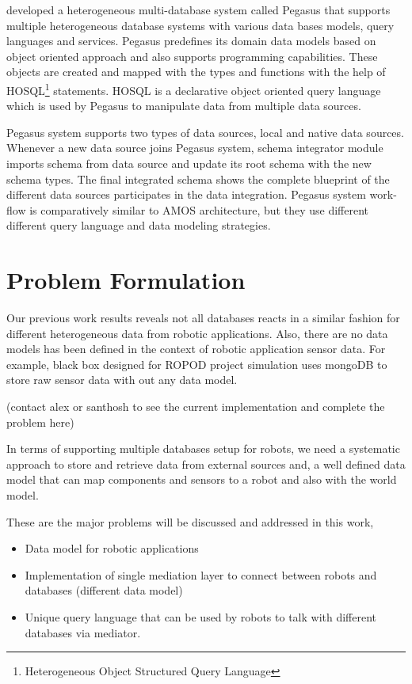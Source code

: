 \documentclass[12pt]{article}
\begin{document}
\citet{ahmed1991pegasus} developed a heterogeneous multi-database system called Pegasus that supports multiple heterogeneous database systems with various data bases models, query languages and services. Pegasus predefines its domain data models based on object oriented approach and also supports programming capabilities. These objects are created and mapped with the types and functions with the help of HOSQL\footnote{\label{myfootnote}Heterogeneous Object Structured Query Language} statements. HOSQL is a declarative object oriented query language which is used by Pegasus to manipulate data from multiple data sources.



Pegasus system supports two types of data sources, local and native data sources. Whenever a new data source joins Pegasus system, schema integrator module imports schema from data source and update its root schema with the new schema types. The final integrated schema shows the complete blueprint of the different data sources participates in the data integration. Pegasus system work-flow is comparatively similar to AMOS architecture, but they use different different query language and data modeling strategies.

\section{Problem Formulation}

Our previous work results reveals not all databases reacts in a similar fashion for different heterogeneous data from robotic applications. Also, there are no data models has been defined in the context of robotic application sensor data. For example, black box designed for ROPOD project simulation uses mongoDB to store raw sensor data with out any data model. 

(contact alex or santhosh to see the current implementation and complete the problem here)

In terms of supporting multiple databases setup for robots,  we need a systematic approach to store and retrieve data from external sources and, a well defined data model that can map components and sensors to a robot and also with the world model.

These are the major problems will be discussed and addressed in this work,
\begin{itemize}
	\item Data model for robotic applications
	\item Implementation of single mediation layer to connect between robots and databases (different data model)
	\item Unique query language that can be used by robots to talk with different databases via mediator.
\end{itemize}
\end{document}
